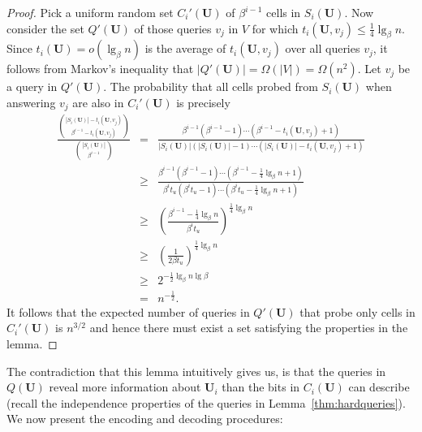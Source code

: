 \documentclass[letterpaper]{article}
\newcommand{\U}{\textbf{U}}
\begin{document}
\begin{proof}
Pick a uniform random set $C_i'(\U)$ of $\beta^{i-1}$ cells in
$S_i(\U)$. Now consider the set $Q'(\U)$ of those queries $v_j$ in
$V$ for which $t_i(\U,v_j) \leq \tfrac{1}{4}\lg_\beta n$. Since
$t_i(\U)=o(\lg_\beta n)$ is the average of $t_i(\U,v_j)$ over all
queries $v_j$, it follows from Markov's inequality that $|Q'(\U)| =
\Omega(|V|) = \Omega(n^2)$. Let $v_j$ be a query in $Q'(\U)$. The
probability that all cells probed from $S_i(\U)$ when answering $v_j$
are also in $C_i'(\U)$ is precisely 
\begin{eqnarray*}
\frac{\binom{|S_i(\U)|-t_i(\U,v_j)}{\beta^{i-1}-t_i(\U,v_j)}}{\binom{|S_i(\U)|}{\beta^{i-1}}}
&=& \frac{\beta^{i-1}(\beta^{i-1}-1) \cdots
  (\beta^{i-1}-t_i(\U,v_j)+1)}{|S_i(\U)|(|S_i(\U)|-1) \cdots (|S_i(\U)|-t_i(\U,v_j)+1)} \\
&\geq& \frac{\beta^{i-1}(\beta^{i-1}-1) \cdots
  (\beta^{i-1}-\tfrac{1}{4} \lg_\beta n+1)}{\beta^it_u(\beta^it_u-1) \cdots (\beta^it_u-\tfrac{1}{4}\lg_\beta n+1)} \\
&\geq& \left(\frac{\beta^{i-1}-\tfrac{1}{4} \lg_\beta n}{\beta^it_u}\right)^{\tfrac{1}{4} \lg_\beta n} \\
&\geq& \left(\frac{1}{2\beta t_u}\right)^{\tfrac{1}{4} \lg_\beta n} \\
&\geq& 2^{-\tfrac{1}{2} \lg_\beta n \lg \beta} \\
&=& n^{-\tfrac{1}{2}}.
\end{eqnarray*}
It follows that the expected number of queries in $Q'(\U)$ that probe
only cells in $C_i'(\U)$ is $n^{3/2}$ and hence there must exist a set
satisfying the properties in the lemma.
\end{proof}

The contradiction that this lemma intuitively gives us, is that the
queries in $Q(\U)$ reveal more information about $\U_i$ than the bits
in $C_i(\U)$ can describe (recall the independence properties of the
queries in Lemma~\ref{thm:hardqueries}). We now present the encoding
and decoding procedures:
\end{document}
